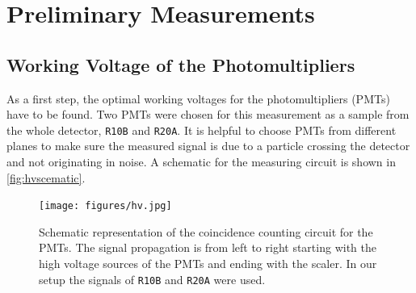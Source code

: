\chapter{Preliminary Measurements}
\label{sec:prem}
\section{Working Voltage of the Photomultipliers}
As a first step, the optimal working voltages for the photomultipliers (PMTs) have to be found.
Two PMTs were chosen for this measurement as a sample from the whole detector, \texttt{R10B} and \texttt{R20A}.
It is helpful to choose PMTs from different planes to make sure the measured signal is due to a 
particle crossing the detector and not originating in noise.
A schematic for the measuring circuit is shown in \autoref{fig:hvscematic}.\\
\begin{figure}
    \centering 
    \texttt{[image: figures/hv.jpg]}
    \caption{Schematic representation of the coincidence counting circuit for the PMTs. 
    The signal propagation is from left to right starting with the high voltage sources of the PMTs and ending with the scaler. In our setup the signals of \texttt{R10B} and \texttt{R20A} were used.}
    \label{fig:hvscematic}
\end{figure}

